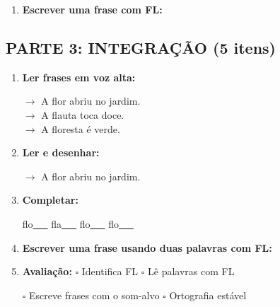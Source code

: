 \begin{exercicio}
\begin{enumerate}[resume]
  \item \textbf{Escrever uma frase com FL:}
  \begin{center}
  \underline{\hspace{12cm}}
  \end{center}

\end{enumerate}

\subsection*{PARTE 3: INTEGRAÇÃO (5 itens)}

\begin{enumerate}[resume]

  \item \textbf{Ler frases em voz alta:}
  \begin{center}
  $\rightarrow$ A flor abriu no jardim.\\
  $\rightarrow$ A flauta toca doce.\\
  $\rightarrow$ A floresta é verde.\\
  \end{center}

  \item \textbf{Ler e desenhar:}
  \begin{center}
  $\rightarrow$ A flor abriu no jardim.
  \end{center}
  \begin{center}
  \end{center}

  \item \textbf{Completar:}
  \begin{center}
  flo\underline{~~~} \quad fla\underline{~~~} \quad flo\underline{~~~} \quad flo\underline{~~~}
  \end{center}

  \item \textbf{Escrever uma frase usando duas palavras com FL:}
  \begin{center}
  \underline{\hspace{12cm}}
  \end{center}

  \item \textbf{Avaliação:} $\square$ Identifica FL \quad $\square$ Lê palavras com FL
  \begin{center}
  $\square$ Escreve frases com o som-alvo \quad $\square$ Ortografia estável
  \end{center}


\end{enumerate}
\end{exercicio}
